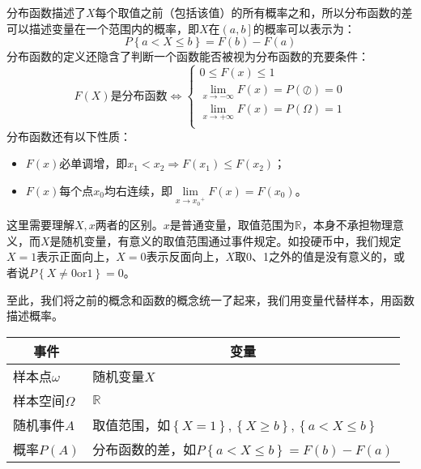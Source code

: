 分布函数描述了$X$每个取值之前（包括该值）的所有概率之和，所以分布函数的差可以描述变量在一个范围内的概率，即$X$在$\left( a,b \right] $的概率可以表示为：
\[
P\left\{ a<X\leqslant b \right\} =F\left( b \right) -F\left( a \right)
\]
分布函数的定义还隐含了判断一个函数能否被视为分布函数的充要条件：
\[
F\left( X \right) \text{是分布函数}\Leftrightarrow \begin{cases}
	0\leqslant F\left( x \right) \leqslant 1\\
	\underset{x\rightarrow -\infty}{\lim}F\left( x \right) =P\left( \oslash \right) =0\\
	\underset{x\rightarrow +\infty}{\lim}F\left( x \right) =P\left( \varOmega \right) =1\\
\end{cases}
\]
分布函数还有以下性质：
\begin{itemize}
    \item $F\left( x \right) $必单调增，即$x_1<x_2\Rightarrow F\left( x_1 \right) \leqslant F\left( x_2 \right) $；
    \item $F\left( x \right) $每个点$x_0$均右连续，即$\underset{x\rightarrow {x_0}^+}{\lim}F\left( x \right) =F\left( x_0 \right) $。
\end{itemize}

这里需要理解$X,x$两者的区别。$x$是普通变量，取值范围为$\mathbb{R} $，本身不承担物理意义，而$X$是随机变量，有意义的取值范围通过事件规定。如投硬币中，我们规定$X=1$表示正面向上，$X=0$表示反面向上，$X$取0、1之外的值是没有意义的，或者说$P\left\{ X\ne 0\mathrm{or}1 \right\} =0$。

至此，我们将之前的概念和函数的概念统一了起来，我们用变量代替样本，用函数描述概率。
\begin{table}[h]
\centering
\begin{tabular}{ll}
    \toprule
    \multicolumn{1}{c}{事件} & \multicolumn{1}{c}{变量}  \\
    \midrule
    样本点$\omega $ & 随机变量$X$\\
    样本空间$\varOmega $ & $\mathbb{R} $\\
    随机事件$A$ & 取值范围，如$\left\{ X=1 \right\} ,\left\{ X\geqslant b \right\} ,\left\{ a<X\leqslant b \right\} $\\
    概率$P\left( A \right) $ & 分布函数的差，如$P\left\{ a<X\leqslant b \right\} =F\left( b \right) -F\left( a \right) $\\
    \bottomrule
\end{tabular}
\end{table}

